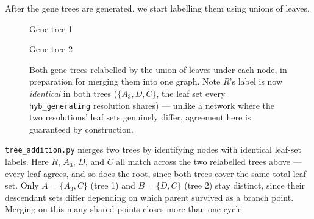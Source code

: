 After the gene trees are generated, we start labelling them using unions of leaves.

\begin{figure}[h]
\centering
\begin{minipage}{0.48\textwidth}
\centering
{}

\small Gene tree 1
\end{minipage}
\hfill
\begin{minipage}{0.48\textwidth}
\centering
{}

\small Gene tree 2
\end{minipage}
\caption{Both gene trees relabelled by the union of leaves under each node, in preparation for merging them into one graph. Note $R$'s label is now \emph{identical} in both trees ($\{A_3,D,C\}$, the leaf set every \texttt{hyb\_generating} resolution shares) --- unlike a network where the two resolutions' leaf sets genuinely differ, agreement here is guaranteed by construction.}
\end{figure}

\texttt{tree\_addition.py} merges two trees by identifying nodes with identical leaf-set labels. Here $R$, $A_3$, $D$, and $C$ all match across the two relabelled trees above --- every leaf agrees, and so does the root, since both trees cover the same total leaf set. Only $A=\{A_3,C\}$ (tree 1) and $B=\{D,C\}$ (tree 2) stay distinct, since their descendant sets differ depending on which parent survived as a branch point. Merging on this many shared points closes more than one cycle:

